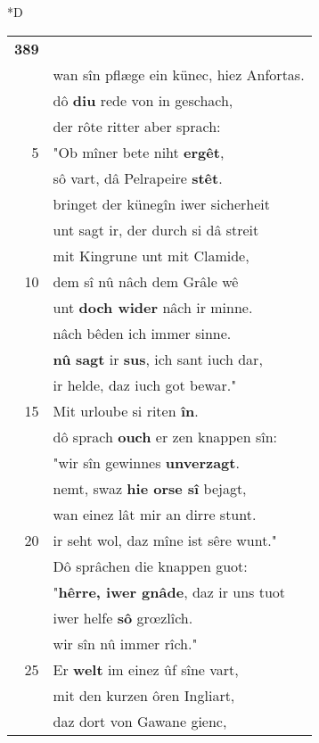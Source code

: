 \documentclass[8pt,a4paper,notitlepage]{article}
\begin{document}
\begin{table}[ht]
\begin{minipage}[t]{0.5\linewidth}
\small
\begin{center}*D
\end{center}
\begin{tabular}{rl}
\textbf{389} & \textbf{\textit{\begin{large}N\end{large}}iht gesagen}, wâ der was,\\ 
 & wan sîn pflæge ein künec, hiez Anfortas.\\ 
 & dô \textbf{diu} rede von in geschach,\\ 
 & der rôte ritter aber sprach:\\ 
5 & "Ob mîner bete niht \textbf{ergêt},\\ 
 & sô vart, dâ Pelrapeire \textbf{stêt}.\\ 
 & bringet der künegîn iwer sicherheit\\ 
 & unt sagt ir, der durch si dâ streit\\ 
 & mit Kingrune unt mit Clamide,\\ 
10 & dem sî nû nâch dem Grâle wê\\ 
 & unt \textbf{doch wider} nâch ir minne.\\ 
 & nâch bêden ich immer sinne.\\ 
 & \textbf{nû} \textbf{sagt} ir \textbf{sus}, ich sant iuch dar,\\ 
 & ir helde, daz iuch got bewar."\\ 
15 & Mit urloube si riten \textbf{în}.\\ 
 & dô sprach \textbf{ouch} er zen knappen sîn:\\ 
 & "wir sîn gewinnes \textbf{unverzagt}.\\ 
 & nemt, swaz \textbf{hie orse sî} bejagt,\\ 
 & wan einez lât mir an dirre stunt.\\ 
20 & ir seht wol, daz mîne ist sêre wunt."\\ 
 & Dô sprâchen die knappen guot:\\ 
 & "\textbf{hêrre, iwer gnâde}, daz ir uns tuot\\ 
 & iwer helfe \textbf{sô} grœzlîch.\\ 
 & wir sîn nû immer rîch."\\ 
25 & Er \textbf{welt} im einez ûf sîne vart,\\ 
 & mit den kurzen ôren Ingliart,\\ 
 & daz dort von Gawane gienc,\\ 

\end{tabular}
\end{minipage}
\end{table}
\end{document}

